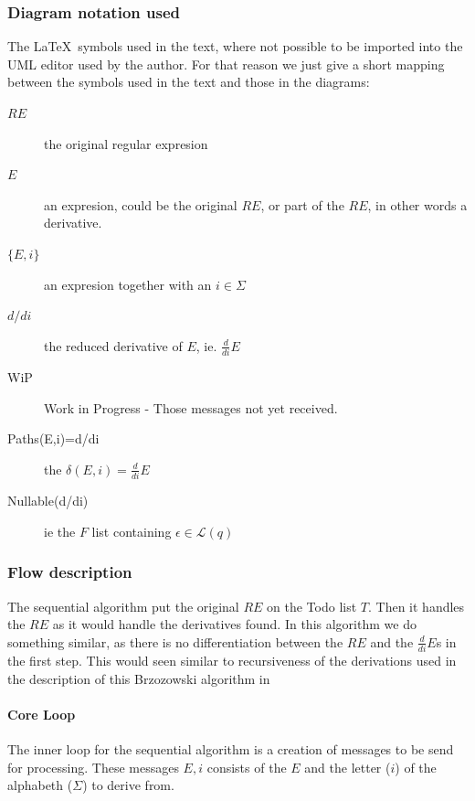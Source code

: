 \documentclass[a4paper,11pt]{report}
\begin{document}
\subsubsection{Diagram notation used}
\label{sec:notation}

The \LaTeX\  symbols used in the text, where not possible to be
imported into the UML editor used by the author. For that reason we
just give a short mapping between the symbols used in the text and
those in the diagrams:
\begin{description}
\item[$RE$] the original regular expresion
\item[$E$] an expresion, could be the original $RE$, or part of the $RE$, in other words a derivative.
\item[$\{E,i\}$] an expresion together with an $i\in\Sigma$
\item[$d/di$] the reduced derivative of $E$, ie. $\frac{d}{di}E$
\item[WiP] Work in Progress - Those messages not yet received.
\item[Paths(E,i)=d/di] the $\delta(E,i)= \frac{d}{di}E$
\item[Nullable(d/di)] ie the $F$ list containing $\epsilon\in\mathcal{L}(q)$
\end{description}

\subsubsection{Flow description}
\label{sec:flow-description}


The sequential algorithm put the original $RE$ on the Todo list
$T$. Then it handles the $RE$ as it would handle the derivatives
found. In this algorithm we do something similar, as there is no
differentiation between the $RE$ and the $\frac{d}{di}E$s in the first
step. This would seen similar to recursiveness of the derivations used
in the description of this Brzozowski algorithm in
\cite{brzozowski1964derivatives}

\paragraph{Core Loop}
\label{sec:inner-loop}

The inner loop for the sequential algorithm is a creation of messages
to be send for processing. These messages ${E,i}$ consists of the $E$ and the
letter ($i$) of the alphabeth ($\Sigma$) to derive from.
\end{document}
